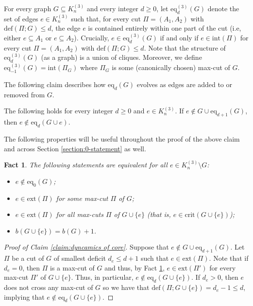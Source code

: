 \documentclass[11pt,a4paper,oneside,reqno]{amsart}
\newtheorem{fact}[thm]{Fact}
\newcommand{\1}{\mathbbm{1}} %
\renewcommand{\le}{\leqslant}
\renewcommand{\ge}{\geqslant}
\newcommand{\deficit}{\mathrm{def}}
\newcommand{\ext}{\mathrm{ext}}
\renewcommand{\int}{\mathrm{int}}
\newcommand{\crit}{\mathrm{crit}}
\newcommand{\eq}{\mathrm{eq}}
\begin{document}
For every graph $G \subseteq K_n^{(3)}$ and every integer $d \ge 0$, let $\eq_d^{(3)}(G)$ denote the set of edges $e \in K_n^{(3)}$ such that, for every cut $\Pi=(A_1, A_2)$ with $\deficit(\Pi; G) \le d$, the edge $e$ is contained entirely within one part of the cut (i.e, either $e \subseteq A_1$ or $e \subseteq A_2$). Crucially, $e \in \eq_d^{(3)}(G)$ if and only if $e \in \int(\Pi)$ for every cut $\Pi=(A_1, A_2)$ with $\deficit(\Pi; G) \le d$.
Note that the structure of $\eq_d^{(3)}(G)$ (as a graph) is a union of cliques. Moreover, we define $\eq_{-1}^{(3)}(G) = \int(\Pi_G)$ where $\Pi_G$ is some (canonically chosen) max-cut of $G$.

The following claim describes how $\eq_d(G)$ evolves as edges are added to or removed from $G$.
\begin{claim}\label{claim:dyncamics of core}
    The following holds for every integer $d \ge 0$ and $e \in K_n^{(3)}$. If $e \notin G \cup \eq_{d+1}(G)$, then $e \notin \eq_d(G \cup e)$.
\end{claim}
The following properties will be useful throughout the proof of the above claim and across Section \ref{section:0-statement} as well.
\begin{fact}\label{fact:equivalence between eq}
    The following statements are equivalent for all $e \in K_n^{(3)} \setminus G$:
    \begin{itemize}
        \item $e \notin \eq_0(G)$;
        \item $e \in \ext(\Pi)$ for some max-cut $\Pi$ of $G$;
        \item $e \in \ext(\Pi)$ for all max-cuts $\Pi$ of $G \cup \{e\}$ (that is, $e \in \crit(G \cup \{e\})$);
        \item $b(G \cup \{e\}) = b(G) + 1$.
    \end{itemize}
\end{fact}
\begin{proof}[Proof of Claim \ref{claim:dyncamics of core}]
    Suppose that $e \notin G \cup \eq_{d+1}(G)$. Let $\Pi$ be a cut of $G$ of smallest deficit $d_e \le d+1$ such that $e \in \ext(\Pi)$. Note that if $d_e=0$, then $\Pi$ is a max-cut of $G$ and thus, by Fact \ref{fact:equivalence between eq}, $e \in \ext(\Pi')$ for every max-cut $\Pi'$ of $G \cup \{e\}$. Thus, in particular, $e \notin \eq_{d}(G \cup \{e\})$. If $d_e > 0$, then $e$ does not cross any max-cut of $G$ so we have that $\deficit(\Pi; G\cup\{e\})=d_e-1 \le d$, implying that $e \notin \eq_{d}(G \cup \{e\})$.
\end{proof}
\end{document}
